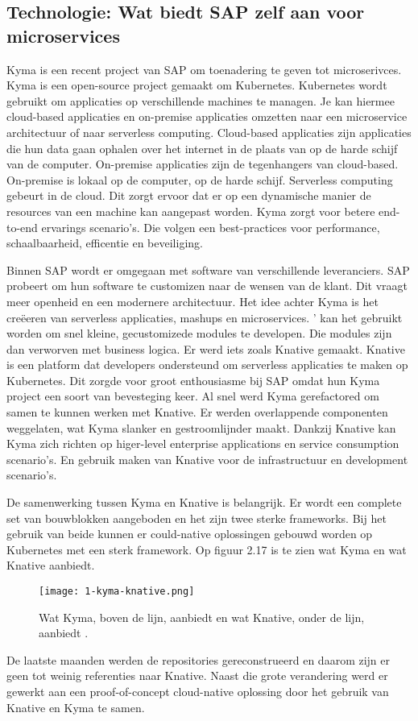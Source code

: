 \subsection{Technologie: Wat biedt SAP zelf aan voor microservices}

 Kyma is een recent project van SAP om toenadering te geven tot microserivces. Kyma is een open-source project gemaakt om Kubernetes. Kubernetes wordt gebruikt om applicaties op verschillende machines te managen. Je kan hiermee cloud-based applicaties en on-premise applicaties omzetten naar een microservice architectuur of naar serverless computing. Cloud-based applicaties zijn applicaties die hun data gaan ophalen over het internet in de plaats van op de harde schijf van de computer. On-premise applicaties zijn de tegenhangers van cloud-based. On-premise is lokaal op de computer, op de harde schijf. Serverless computing gebeurt in de cloud. Dit zorgt ervoor dat er op een dynamische manier de resources van een machine kan aangepast worden. 
Kyma zorgt voor betere end-to-end ervarings scenario's. Die volgen een best-practices voor performance, schaalbaarheid, efficentie en beveiliging. \textcite{Kyma2019}

Binnen SAP wordt er omgegaan met software van verschillende leveranciers. SAP probeert om hun software te customizen naar de  wensen van de klant. Dit vraagt meer openheid en een modernere architectuur. 
Het idee achter Kyma is het creëeren van serverless applicaties, mashups en microservices. ' kan het gebruikt worden om snel kleine, gecustomizede modules te developen. Die modules zijn dan verworven met business logica. 
Er  werd iets zoals Knative gemaakt. Knative is een platform dat developers ondersteund om serverless applicaties te maken op Kubernetes. Dit zorgde voor groot enthousiasme bij SAP omdat hun Kyma project een soort van bevesteging keer. Al snel  werd Kyma gerefactored om samen te kunnen  werken met Knative. Er  werden overlappende componenten  weggelaten, wat Kyma slanker en gestroomlijnder maakt. Dankzij Knative kan Kyma zich richten op higer-level enterprise applications en service consumption scenario's. En gebruik maken van Knative voor de infrastructuur en development scenario's. \textcite{Semerdzhiev2018}

 De samenwerking tussen Kyma en Knative is belangrijk. Er wordt een complete set van bouwblokken aangeboden en het zijn twee sterke frameworks. Bij het gebruik van beide kunnen er could-native oplossingen gebouwd worden op Kubernetes met een sterk framework. Op figuur 2.17 is te zien wat Kyma en wat Knative aanbiedt. \textcite{Hofmann2018}
\begin{figure}[h]
	\texttt{[image: 1-kyma-knative.png]}
	\caption{Wat Kyma, boven de lijn, aanbiedt en wat Knative, onder de lijn, aanbiedt \textcite{Hofmann2018}.}
	\centering
\end{figure}
De laatste maanden  werden de repositories gereconstrueerd en daarom zijn er geen tot  weinig referenties naar Knative. Naast die grote verandering  werd er gewerkt aan een proof-of-concept cloud-native oplossing door het gebruik van Knative en Kyma te samen. 

